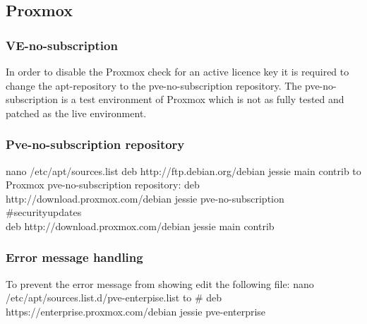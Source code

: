 \newpage

\subsection{Proxmox}
\subsubsection{VE-no-subscription}
In order to disable the Proxmox check for an active licence key it is required to change the apt-repository to the pve-no-subscription repository.
The pve-no-subscription is a test environment of Proxmox which is not as fully tested and patched as the live environment.

\subsubsection{Pve-no-subscription repository}
nano /etc/apt/sources.list
\newline
deb http://ftp.debian.org/debian jessie main contrib
\newline
to
\\
Proxmox pve-no-subscription repository:
deb http://download.proxmox.com/debian jessie pve-no-subscription
\newline
\#securityupdates
\\
deb http://download.proxmox.com/debian jessie main contrib

\subsubsection{Error message handling}
To prevent the error message from showing edit the following file:
\newline
nano /etc/apt/sources.list.d/pve-enterpise.list
\newline
to
\newline
\# deb https://enterprise.proxmox.com/debian jessie pve-enterprise